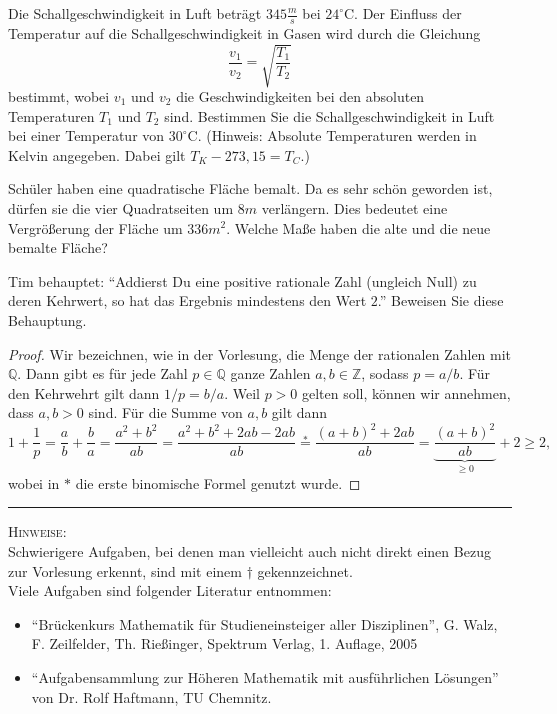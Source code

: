\documentclass[11pt]{article}
\begin{document}
\begin{task}
	Die Schallgeschwindigkeit in Luft betr\"agt $345 \frac{m}{s}$ bei $24^\circ$C. Der Einfluss der Temperatur auf die Schallgeschwindigkeit in Gasen wird durch die Gleichung
	\[
	\frac{v_1}{v_2}=\sqrt{\frac{T_1}{T_2}}
	\]
	bestimmt, wobei $v_1$ und $v_2$ die Geschwindigkeiten bei den absoluten Temperaturen $T_1$ und $T_2$ sind. Bestimmen Sie die Schallgeschwindigkeit in Luft bei einer Temperatur von $30^\circ$C. (Hinweis: Absolute Temperaturen werden in Kelvin angegeben. Dabei gilt $T_K-273,15=T_C$.)
\end{task}

\dotfill
\begin{task}
Sch\"uler haben eine quadratische Fl\"ache bemalt. Da es sehr sch\"on geworden ist, d\"urfen sie die vier Quadratseiten um $8m$ verl\"angern. Dies bedeutet eine Vergr\"o\ss erung der Fl\"ache um $336m^2$. Welche Ma\ss e haben die alte und die neue bemalte Fl\"ache?
\end{task}
\begin{htask}
	Tim behauptet: ``Addierst Du eine positive rationale Zahl (ungleich Null) zu deren Kehrwert, so hat das Ergebnis mindestens den Wert $2$.'' Beweisen Sie diese Behauptung.
\end{htask}
\begin{proof}
	Wir bezeichnen, wie in der Vorlesung, die Menge der rationalen Zahlen mit $\mathbb{Q}$. Dann gibt es für jede Zahl $p\in \mathbb{Q}$ ganze Zahlen $a,b\in \mathbb{Z}$, sodass $p = a/b$. Für den Kehrwehrt gilt dann $1/p = b/a$. Weil $p>0$ gelten soll, können wir annehmen, dass $a,b>0$ sind. Für die Summe von $a,b$ gilt dann
	\[
	1+\frac{1}{p} =  \frac{a}{b} + \frac{b}{a}= \frac{a^2+b^2}{ab} = \frac{a^2+b^2+2ab-2ab}{ab} \overset{\ast}{=} \frac{(a+b)^2+2ab}{ab} = \underbrace{\frac{(a+b)^2}{ab}}_{\geq 0} + 2 \geq 2,
	\]
	wobei in $\ast$ die erste binomische Formel genutzt wurde.
	
\end{proof}	
\hrule
\vspace{.5cm}
\noindent
\textsc{Hinweise:}\\
Schwierigere Aufgaben, bei denen man vielleicht auch nicht direkt einen Bezug zur Vorlesung erkennt, sind mit einem $\dagger$ gekennzeichnet.\\
Viele Aufgaben sind folgender Literatur entnommen:
\begin{itemize}
	\item ``Br\"uckenkurs Mathematik f\"ur Studieneinsteiger aller Disziplinen'', G. Walz, F. Zeilfelder, Th. Rie\ss inger, Spektrum Verlag, 1. Auflage, 2005
	\item ``Aufgabensammlung zur H\"oheren Mathematik mit ausf\"uhrlichen L\"osungen'' von Dr. Rolf Haftmann, TU Chemnitz.
\end{itemize}
\end{document}
